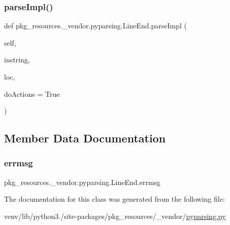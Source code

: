 \subsubsection{\texorpdfstring{parse\+Impl()}{parseImpl()}}
{\footnotesize\ttfamily def pkg\+\_\+resources.\+\_\+vendor.\+pyparsing.\+Line\+End.\+parse\+Impl (\begin{DoxyParamCaption}\item[{}]{self,  }\item[{}]{instring,  }\item[{}]{loc,  }\item[{}]{do\+Actions = {\ttfamily True} }\end{DoxyParamCaption})}



\subsection{Member Data Documentation}
\mbox{\label{classpkg__resources_1_1__vendor_1_1pyparsing_1_1LineEnd_a3029a49045592265c38d7f85bb19c5a3}} 
\subsubsection{\texorpdfstring{errmsg}{errmsg}}
{\footnotesize\ttfamily pkg\+\_\+resources.\+\_\+vendor.\+pyparsing.\+Line\+End.\+errmsg}



The documentation for this class was generated from the following file\+:\begin{DoxyCompactItemize}
\item 
venv/lib/python3./site-\/packages/pkg\+\_\+resources/\+\_\+vendor/\hyperlink{pkg__resources_2__vendor_2pyparsing_8py}{pyparsing.\+py}\end{DoxyCompactItemize}
